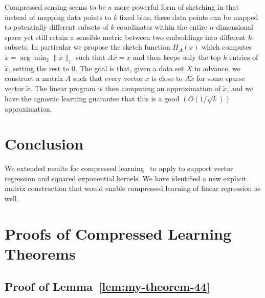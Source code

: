 \documentclass[english]{article}
\theoremstyle{plain}
\begin{document}
Compressed sensing seems to be a more powerful form of sketching in that instead of mapping data points to $k$ fixed bins, these data points can be mapped to potentially different subsets of $k$ coordinates within the entire $n$-dimensional space yet still retain a sensible metric between two embeddings into different $k$-subsets. In particular we propose the sketch function $H_A(x)$ which computes $\tilde{x} = \arg\min_{\hat{x}} \|\hat{x}\|_1$ such that $A\hat{x}=x$ and then keeps only the top $k$ entries of $\tilde{x}$, setting the rest to $0$. The goal is that, given a data set $X$ in advance, we construct a matrix $A$ such that every vector $x$ is close to $A\tilde{x}$ for some sparse vector $\tilde{x}$. The linear program is then computing an approximation of $\tilde{x}$, and we have the agnostic learning guarantee that this is a good $\left(O(1/\sqrt{k})\right)$ approximation. 

\section{Conclusion}
We extended results for compressed learning~\citep{Calderbank2009} to apply to support vector regression and squared exponential kernels. We have identified a new explicit matrix construction that would enable compressed learning of linear regression as well.




\appendix
\section{Proofs of Compressed Learning Theorems}

\subsection{Proof of Lemma~\ref{lem:my-theorem-44}}
\label{app:my-theorem-44-proof}
\end{document}
